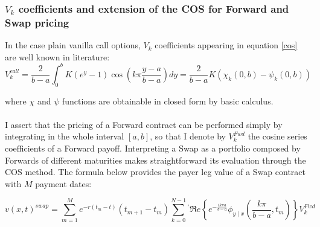 \documentclass{beamer}
\begin{document}
\begin{frame}
\frametitle{$V_{k}$ coefficients and extension of the COS for Forward and Swap pricing}
 	In the case plain vanilla call options, $V_{k}$ coefficients appearing in equation \ref{cos} are well known in literature:
		\footnotesize{
		\begin{equation}
			V_{k}^{call} = \frac{2}{b-a}\int_{0}^{b}K(e^y -1) \cos \left( k\pi \frac{y-a}{b-a}\right) dy = \frac{2}{b-a}K(\chi_{k}(0,b)-\psi_{k}(0,b))
		\end{equation} }

	where $\chi$ and $\psi$ functions are obtainable in closed form by basic calculus. \\~\\

	I assert that the pricing of a Forward contract can be performed simply by integrating in the whole interval $[a,b]$, so that I denote  by $V_{k}^{Fwd}$ the cosine series coefficients of a Forward payoff. Interpreting a Swap as a portfolio composed by Forwards of different maturities makes straightforward its evaluation through the COS method. 
	The formula below provides the payer leg value of a Swap contract with $M$ payment dates:

	\begin{equation}\label{cosSwap}
		v(x,t)^{swap} = \sum_{m = 1}^{M} e^{-r(t_m - t) } (t_{m+1} - t_m) \sum^{N-1}_{k = 0} {}^{'} \Re e \left\{ e^{ -\frac{ik\pi a}{b-a}} \phi_{y \mid  x}\left( \frac{k\pi}{b-a},t_m\right)\right\}V_{k}^{Fwd}
	\end{equation}

\end{frame}
\end{document}

